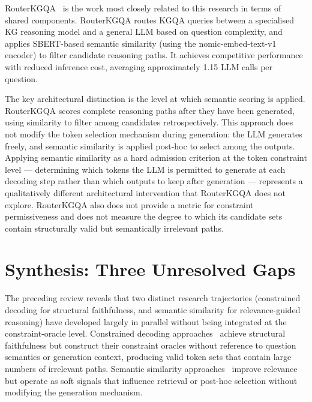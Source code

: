 RouterKGQA~\citep{yuan2026routerkgqa} is the work most closely related to this research in terms of shared components. RouterKGQA routes KGQA queries between a specialised KG reasoning model and a general LLM based on question complexity, and applies SBERT-based semantic similarity (using the nomic-embed-text-v1 encoder) to filter candidate reasoning paths. It achieves competitive performance with reduced inference cost, averaging approximately 1.15 LLM calls per question.

The key architectural distinction is the level at which semantic scoring is applied. RouterKGQA scores complete reasoning paths after they have been generated, using similarity to filter among candidates retrospectively. This approach does not modify the token selection mechanism during generation: the LLM generates freely, and semantic similarity is applied post-hoc to select among the outputs. Applying semantic similarity as a hard admission criterion at the token constraint level — determining which tokens the LLM is permitted to generate at each decoding step rather than which outputs to keep after generation — represents a qualitatively different architectural intervention that RouterKGQA does not explore. RouterKGQA also does not provide a metric for constraint permissiveness and does not measure the degree to which its candidate sets contain structurally valid but semantically irrelevant paths.

\section{Synthesis: Three Unresolved Gaps}
\label{sec:synthesis}

The preceding review reveals that two distinct research trajectories (constrained decoding for structural faithfulness, and semantic similarity for relevance-guided reasoning) have developed largely in parallel without being integrated at the constraint-oracle level. Constrained decoding approaches~\citep{luo2024gcr, li2024dog} achieve structural faithfulness but construct their constraint oracles without reference to question semantics or generation context, producing valid token sets that contain large numbers of irrelevant paths. Semantic similarity approaches~\citep{shi2021kgpath, saxena2022kgqa, yuan2026routerkgqa} improve relevance but operate as soft signals that influence retrieval or post-hoc selection without modifying the generation mechanism.

